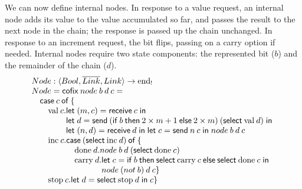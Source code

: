 \documentclass[orivec,envcountsame]{llncs}
\makeatletter
\newcommand{\gvdual}[1]{\overline{#1}}
\newcommand{\uto}{\ensuremath{\rightarrow}}
\newcommand{\outterm}{\mathrm{end}_!}
\newcommand{\mkwd}[1]{\mathsf{#1}}
\newcommand{\clabel}[1]{\mathrm{#1}}
\newcommand{\gvsend}[2]{\mkwd{send}\:#1\:#2}
\newcommand{\gvreceive}[1]{\mkwd{receive}\:#1}
\newcommand{\gvlet}[3]{\mkwd{let}\;#1 = #2\;\mkwd{in}\;#3}
\newcommand{\gvselect}[2]{\mkwd{select}\:#1\:#2}
\newcommand{\lrkwd}{\mkwd{cofix}}
\newcommand{\gvifthen}[3]{\mkwd{if}\:#1\:\mkwd{then}\:#2\:\mkwd{else}\:#3}
\newcommand{\ba}{\begin{array}}
\newcommand{\ea}{\end{array}}
\newcommand{\bl}{\ba[t]{@{}l@{}}}
\newcommand{\el}{\ea}
\makeatother
\begin{document}
We can now define internal nodes. In response to a value request, an internal node adds its value to
the value accumulated so far, and passes the result to the next node in the chain; the response is
passed up the chain unchanged. In response to an increment request, the bit flips, passing on a
carry option if needed. Internal nodes require two state components: the represented bit ($b$) and
the remainder of the chain ($d$).
%
\[
\bl
Node : \langle Bool, \gvdual{Link}, Link \rangle \uto \outterm \\
Node = \lrkwd\:node\:b\:d\:c = \\
\quad
  \bl
  \mkwd{case}\:c\:\mkwd{of}\:\{ \\
    \quad
      \bl
      \clabel{val}\:c.
        \bl
        \gvlet{(m,c)}{\gvreceive{c}}{} \\
        \gvlet{d}{\gvsend{(\gvifthen{b}{2 \times m + 1}{2 \times m})}{(\gvselect{\clabel{val}}{d})}}{} \\
        \gvlet{(n,d)}{\gvreceive{d}}{
        \gvlet{c}{\gvsend{n}{c}}{
        node\:b\:d\:c}} \\
        \el \\
      \clabel{inc}\:c.
        \bl
        \mkwd{case}\:(\gvselect{\clabel{inc}}{d})\:\mkwd{of}\:\{ \\
        \quad
          \bl
          \clabel{done}\:d. node\:b\:d\:(\gvselect{\clabel{done}}{c}) \\
          \clabel{carry}\:d.
            \bl
            \gvlet{c}{\gvifthen{b}{\gvselect{\clabel{carry}}{c}}{\gvselect{\clabel{done}}{c}}}{} \\
            node\:(not\:b)\:d\:c \} \\
            \el \\
          \el \\
        \el \\
      \clabel{stop}\:c. \gvlet{d}{\gvselect{\clabel{stop}}{d}}{c} \} \\
      \el \\
  \el \\
\el
\]
\end{document}
